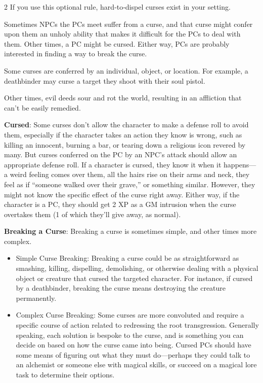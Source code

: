 \begin{multicols}{2}
If you use this optional rule, hard‑to‑dispel curses exist in your setting. 

Sometimes NPCs the PCs meet suffer from a curse, and that curse might confer upon them an unholy ability that makes it difficult for the PCs to deal with them. Other times, a PC might be cursed. Either way, PCs are probably interested in finding a way to break the curse. 

Some curses are conferred by an individual, object, or location. For example, a deathbinder may curse a target they shoot with their soul pistol. 

Other times, evil deeds sour and rot the world, resulting in an affliction that can’t be easily remedied.

\textbf{Cursed}: Some curses don’t allow the character to make a defense roll to avoid them, especially if the character takes an action they know is wrong, such as killing an innocent, burning a bar, or tearing down a religious icon revered by many. But curses conferred on the PC by an NPC’s attack should allow an appropriate defense roll. If a character is cursed, they know it when it happens—a weird feeling comes over them, all the hairs rise on their arms and neck, they feel as if “someone walked over their grave,” or something similar. However, they might not know the specific effect of the curse right away. Either way, if the character is a PC, they should get 2 XP as a GM intrusion when the curse overtakes them (1 of which they’ll give away, as normal).

\textbf{Breaking a Curse}: Breaking a curse is sometimes simple, and other times more complex. 

\begin{itemize}
\item Simple Curse Breaking: Breaking a curse could be as straightforward as smashing, killing, dispelling, demolishing, or otherwise dealing with a physical object or creature that cursed the targeted character. For instance, if cursed by a deathbinder, breaking the curse means destroying the creature permanently. 
\item Complex Curse Breaking: Some curses are more convoluted and require a specific course of action related to redressing the root transgression. Generally speaking, each solution is bespoke to the curse, and is something you can decide on based on how the curse came into being. Cursed PCs should have some means of figuring out what they must do—perhaps they could talk to an alchemist or someone else with magical skills, or succeed on a magical lore task to determine their options. 
\end{itemize}


\end{multicols}
